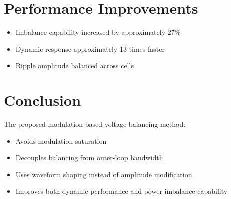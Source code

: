 \documentclass[11pt]{article}
\begin{document}
\section{Performance Improvements}

\begin{itemize}
\item Imbalance capability increased by approximately 27\%
\item Dynamic response approximately 13 times faster
\item Ripple amplitude balanced across cells
\end{itemize}

\section{Conclusion}

The proposed modulation-based voltage balancing method:

\begin{itemize}
\item Avoids modulation saturation
\item Decouples balancing from outer-loop bandwidth
\item Uses waveform shaping instead of amplitude modification
\item Improves both dynamic performance and power imbalance capability
\end{itemize}
\end{document}
